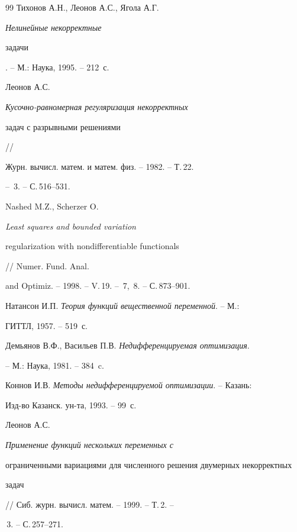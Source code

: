 \begin{thebibliography}{99}
Тихонов А.Н., Леонов А.С., Ягола А.Г. {\em Нелинейные некорректные


задачи}. -- М.: Наука, 1995. -- 212~с.




Леонов А.С. {\em Кусочно-равномерная регуляризация некорректных


задач с разрывными решениями} //


Журн. вычисл. матем. и матем. физ. -- 1982. -- Т.\,22.


-- \No\,3. -- С.\,516--531.




Nashed M.Z., Scherzer O. {\em Least squares and bounded variation


regularization with nondifferentiable functionals} // Numer. Fund. Anal.


and Optimiz. -- 1998. -- V.\,19. -- \No\,7,~8. -- С.\,873--901.




Натансон И.П. {\em Теория функций вещественной переменной}. -- М.:


ГИТТЛ, 1957. -- 519~с.




Демьянов В.Ф., Васильев П.В. {\em Недифференцируемая оптимизация}.


-- М.: Наука, 1981. -- 384~c.




Коннов И.В. {\em Методы недифференцируемой оптимизации}. -- Казань:


Изд-во Казанск. ун-та, 1993. -- 99~с.




Леонов А.С. {\em Применение функций нескольких переменных с


ограниченными вариациями для численного решения двумерных некорректных


задач} // Сиб. журн. вычисл. матем. -- 1999. -- Т.\,2. -- 


\No\,3. -- С.\,257--271.





\end{thebibliography}





\vskip 2cm














\label{end}





